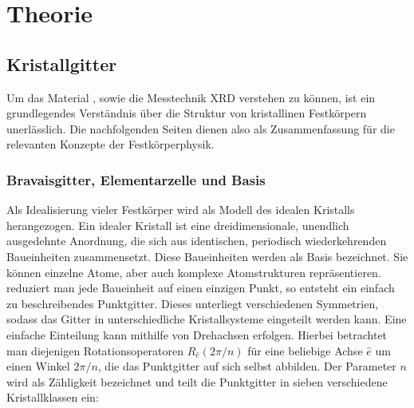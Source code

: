\section{Theorie}

\subsection{Kristallgitter}
Um das Material \heo, sowie die Messtechnik XRD verstehen zu können, ist ein grundlegendes Verständnis
über die Struktur von kristallinen Festkörpern unerlässlich.
Die nachfolgenden Seiten dienen also als Zusammenfassung für die relevanten Konzepte der Festkörperphysik.

\subsubsection{Bravaisgitter, Elementarzelle und Basis}
Als Idealisierung vieler Festkörper wird als Modell des idealen Kristalls herangezogen.
Ein idealer Kristall ist eine dreidimensionale, unendlich ausgedehnte Anordnung, die sich aus identischen, periodisch
wiederkehrenden Baueinheiten zusammensetzt.
Diese Baueinheiten werden als Basis bezeichnet.
Sie können einzelne Atome, aber auch komplexe Atomstrukturen repräsentieren.
reduziert man jede Baueinheit auf einen einzigen Punkt, so entsteht ein einfach zu beschreibendes Punktgitter.
\autocite[49]{Hunklinger}
Dieses unterliegt verschiedenen Symmetrien, sodass das Gitter in unterschiedliche Kristallsysteme eingeteilt werden
kann.
Eine einfache Einteilung kann mithilfe von Drehachsen erfolgen.
Hierbei betrachtet man diejenigen Rotationsoperatoren $R_{\hat{e}}(2\pi / n)$ für eine beliebige Achse $\hat{e}$ um
einen Winkel $2 \pi /n$, die das Punktgitter auf sich selbst abbilden.
Der Parameter $n$ wird als Zähligkeit bezeichnet und teilt die Punktgitter in sieben verschiedene Kristallklassen ein:
\autocite[53]{Hunklinger}



